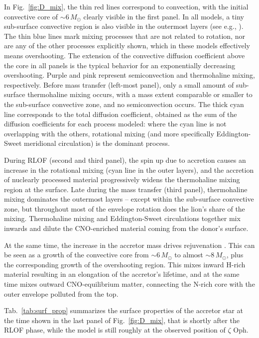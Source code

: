 \documentclass[twocolumn,twocolappendix,trackchanges]{aastex63}
\DeclareRobustCommand{\Figref}[1]{Fig.~\ref{#1}}
\DeclareRobustCommand{\Tabref}[1]{Tab.~\ref{#1}}
\newcommand{\zoph}{$\zeta$ Oph}
\begin{document}
In \Figref{fig:D_mix}, the thin red lines correspond to convection,
with the initial convective core of
$\sim$$6\,M_\odot$ clearly visible in the first panel. In all models, a tiny sub-surface convective region is also visible in the outermost layers (see e.g., \citealt{cantiello:21}).  The thin blue lines mark mixing processes that are not related to rotation, nor are any of the other processes explicitly shown, which in these models effectively means overshooting. The extension of the convective diffusion coefficient above the core in all panels is the typical behavior for an exponentially decreasing overshooting. Purple and pink represent semiconvection and thermohaline mixing, respectively. Before mass transfer (left-most panel), only a small amount of sub-surface thermohaline mixing occurs, with a mass extent comparable or smaller to the sub-surface convective zone, and no semiconvection occurs. The thick cyan line corresponds to the total diffusion coefficient, obtained as the sum of the diffusion coefficients for each process modeled: where the cyan line is not overlapping with the others, rotational mixing (and more specifically Eddington-Sweet meridional circulation) is the dominant process.

During RLOF (second and third panel), the spin up due to accretion causes an increase in the rotational mixing (cyan line in the outer layers), and the accretion of nuclearly processed material progressively widens the thermohaline mixing region at the surface. Late during the mass transfer (third panel), thermohaline mixing dominates the outermost layers -- except within the sub-surface convective zone, but throughout most of the envelope rotation does the lion's share of the mixing. Thermohaline mixing and Eddington-Sweet circulations together mix inwards and dilute the CNO-enriched material coming from the donor's surface.

At the same time, the increase in the accretor mass drives
rejuvenation \citep[e.g.,][]{schneider:16}. This can be seen as a
growth of the convective core from
$\sim$$6\,M_\odot$ to almost $\sim$$8\,M_\odot$, plus the
corresponding growth of the overshooting region. This mixes inward
H-rich material resulting in an elongation of the accretor's lifetime,
and at the same time mixes outward CNO-equilibrium matter, connecting
the N-rich core with the outer envelope polluted from the top.



\Tabref{tab:surf_prop} summarizes the surface properties of the
accretor star at the time shown in the last panel of
\Figref{fig:D_mix}, that is shortly after the RLOF phase, while the
model is still roughly at the observed position of \zoph.
\end{document}
